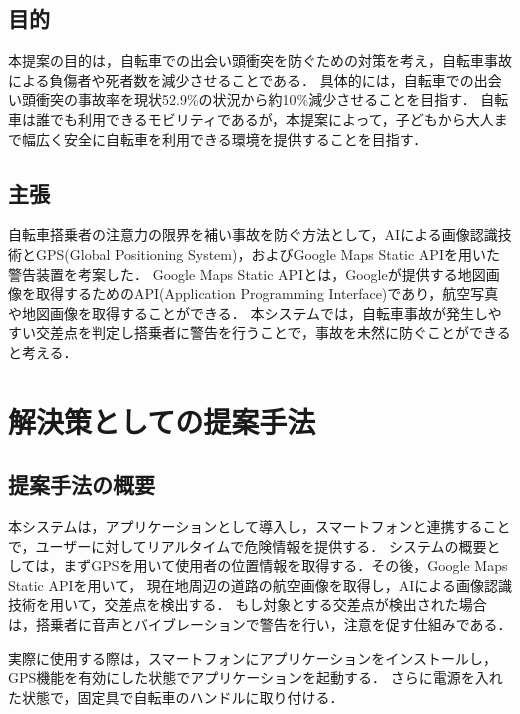 \documentclass[uplatex,dvipdfmx]{jsarticle}
\begin{document}
\subsection{目的}

\indent
本提案の目的は，自転車での出会い頭衝突を防ぐための対策を考え，自転車事故による負傷者や死者数を減少させることである．
具体的には，自転車での出会い頭衝突の事故率を現状52.9\%の状況から約10\%減少させることを目指す．
自転車は誰でも利用できるモビリティであるが，本提案によって，子どもから大人まで幅広く安全に自転車を利用できる環境を提供することを目指す．
\par

\subsection{主張}
自転車搭乗者の注意力の限界を補い事故を防ぐ方法として，AIによる画像認識技術とGPS(Global Positioning System)，およびGoogle Maps Static APIを用いた警告装置を考案した．
Google Maps Static APIとは，Googleが提供する地図画像を取得するためのAPI(Application Programming Interface)であり，航空写真や地図画像を取得することができる．
本システムでは，自転車事故が発生しやすい交差点を判定し搭乗者に警告を行うことで，事故を未然に防ぐことができると考える．
\par

\section{解決策としての提案手法}
\subsection{提案手法の概要}

\indent
本システムは，アプリケーションとして導入し，スマートフォンと連携することで，ユーザーに対してリアルタイムで危険情報を提供する．
システムの概要としては，まずGPSを用いて使用者の位置情報を取得する．その後，Google Maps Static APIを用いて，
現在地周辺の道路の航空画像を取得し，AIによる画像認識技術を用いて，交差点を検出する．
もし対象とする交差点が検出された場合は，搭乗者に音声とバイブレーションで警告を行い，注意を促す仕組みである．
\par
実際に使用する際は，スマートフォンにアプリケーションをインストールし，GPS機能を有効にした状態でアプリケーションを起動する．
さらに電源を入れた状態で，固定具で自転車のハンドルに取り付ける．
\par
\end{document}
